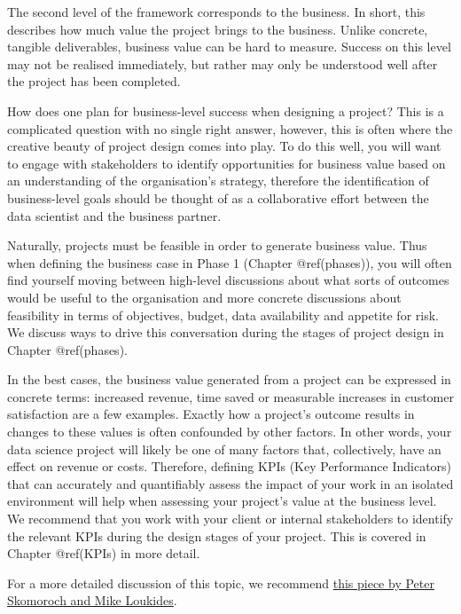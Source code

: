 \documentclass[
]{book}
\begin{document}
The second level of the framework corresponds to the business. In short,
this describes how much value the project brings to the business. Unlike
concrete, tangible deliverables, business value can be hard to measure.
Success on this level may not be realised immediately, but rather may
only be understood well after the project has been completed.

How does one plan for business-level success when designing a project?
This is a complicated question with no single right answer, however,
this is often where the creative beauty of project design comes into
play. To do this well, you will want to engage with stakeholders to
identify opportunities for business value based on an understanding of
the organisation's strategy, therefore the identification of
business-level goals should be thought of as a collaborative effort
between the data scientist and the business partner.

Naturally, projects must be feasible in order to generate business
value. Thus when defining the business case in Phase 1 (Chapter
@ref(phases)), you will often find yourself moving between high-level
discussions about what sorts of outcomes would be useful to the
organisation and more concrete discussions about feasibility in terms of
objectives, budget, data availability and appetite for risk. We discuss
ways to drive this conversation during the stages of project design in
Chapter @ref(phases).

In the best cases, the business value generated from a project can be
expressed in concrete terms: increased revenue, time saved or measurable
increases in customer satisfaction are a few examples. Exactly how a
project's outcome results in changes to these values is often confounded
by other factors. In other words, your data science project will likely
be one of many factors that, collectively, have an effect on revenue or
costs. Therefore, defining KPIs (Key Performance Indicators) that can
accurately and quantifiably assess the impact of your work in an
isolated environment will help when assessing your project's value at
the business level. We recommend that you work with your client or
internal stakeholders to identify the relevant KPIs during the design
stages of your project. This is covered in Chapter @ref(KPIs) in more
detail.

For a more detailed discussion of this topic, we recommend
\href{https://www.oreilly.com/radar/what-you-need-to-know-about-product-management-for-ai/}{this
piece by Peter Skomoroch and Mike Loukides}.
\end{document}
